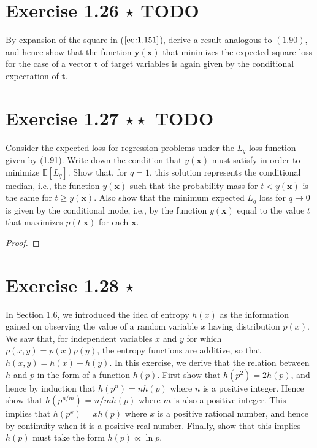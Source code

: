 \section*{Exercise 1.26 $\star$ TODO}
By expansion of the square in ($\ref{eq:1.151}$), derive a result analogous to
$(1.90)$, and hence show that the function $\mathbf{y}(\mathbf{x})$ that
minimizes the expected square loss for the case of a vector $\mathbf{t}$ 
of target variables is again given by the conditional expectation of $\mathbf{t}$.

\section*{Exercise 1.27 $\star \star$ TODO}
Consider the expected loss for regression problems under the $L_q$ loss
function given by (1.91). Write down the condition that $y(\mathbf{x})$ 
must satisfy in order to minimize $\mathbb{E}[L_q]$. Show that, for $q = 1$,
this solution represents the conditional median, i.e., the function 
$y(\mathbf{x})$ such that the probability mass for $t < y(\mathbf{x})$ 
is the same for $t \geq y(\mathbf{x})$. Also show that the minimum expected
$L_q$ loss for $q \to 0$ is given by the conditional mode, i.e., by
the function $y(\mathbf{x})$ equal to the value $t$ that maximizes 
$p(t | \mathbf{x})$ for each  $\mathbf{x}$.

\vspace{1em}

\begin{proof}
    
\end{proof}

\section*{Exercise 1.28 $\star$}
In Section 1.6, we introduced the idea of entropy $h(x)$ as the information
gained on observing the value of a random variable  $x$ having distribution
$p(x)$. We saw that, for independent variables $x$ and $y$ for which
$p(x, y) = p(x)p(y)$, the entropy functions are additive, so that 
$h(x, y) = h(x) + h(y)$. In this exercise, we derive that the relation
between $h$ and  $p$ in the form of a function  $h(p)$. First show that
$h(p^2) = 2h(p)$, and hence by induction that $h(p^n) = nh(p)$ where
$n$ is a positive integer. Hence show that $h(p^{n/m})$ = $n/m h(p)$
where $m$ is also a positive integer. This implies that $h(p^x) = xh(p)$ where
$x$ is a positive rational number, and hence by continuity when it is
a positive real number. Finally, show that this implies $h(p)$ must take
the form  $h(p) \propto \ln p$.

